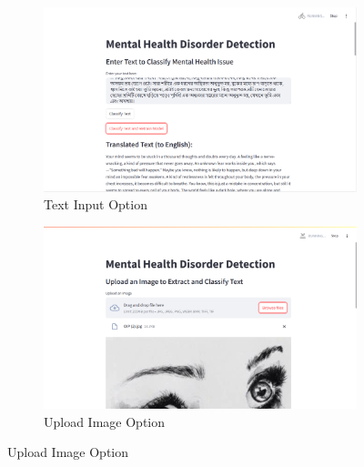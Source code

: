\begin{figure}[h!]
    \centering
    \begin{subfigure}[b]{0.495\textwidth}
        \centering
        \includegraphics[width=\textwidth]{App Images/02 Interface.png}
        \caption*{Text Input Option}
        \label{fig:02i}
    \end{subfigure}
    \hfill
    \begin{subfigure}[b]{0.495\textwidth}
        \centering
        \includegraphics[width=\textwidth]{App Images/04 Interface.png}
        \caption*{Upload Image Option}
        \label{fig:04i}
    \end{subfigure}
    \label{fig:app_interfaces}
\end{figure}

\vspace{-2em}

